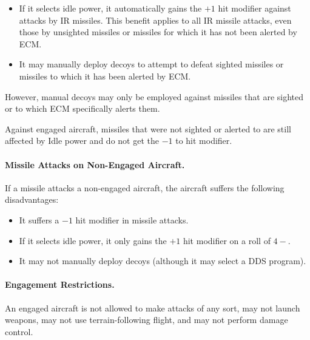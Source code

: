 {\begin{itemize}

    \item If it selects idle power, it automatically gains the $+1$ hit modifier against attacks by IR missiles. This benefit applies to all IR missile attacks, even those by unsighted missiles or missiles for which it has not been alerted by ECM.
    
    \item It may manually deploy decoys to attempt to defeat sighted missiles or missiles to which it has been alerted by ECM.
    
\end{itemize}


However, manual decoys may only be employed against missiles that are sighted or to which ECM specifically alerts them. 

Against engaged aircraft, missiles that were not sighted or alerted to are still affected by Idle power and do not get the $-1$ to hit modifier.

\paragraph{Missile Attacks on Non-Engaged Aircraft.} If a missile attacks a non-engaged aircraft, the aircraft suffers the following disadvantages:

\begin{itemize}

    \item It suffers a $-1$ hit modifier in missile attacks.

    \item If it selects idle power, it only gains the $+1$ hit modifier on a roll of $4-$. 
    
    \item It may not manually deploy decoys (although it may select a DDS program).
    
\end{itemize}


\paragraph{Engagement Restrictions.} An engaged aircraft is not allowed to make attacks of any sort, may not launch weapons, may not use terrain-following flight, and may not perform damage control.

}


